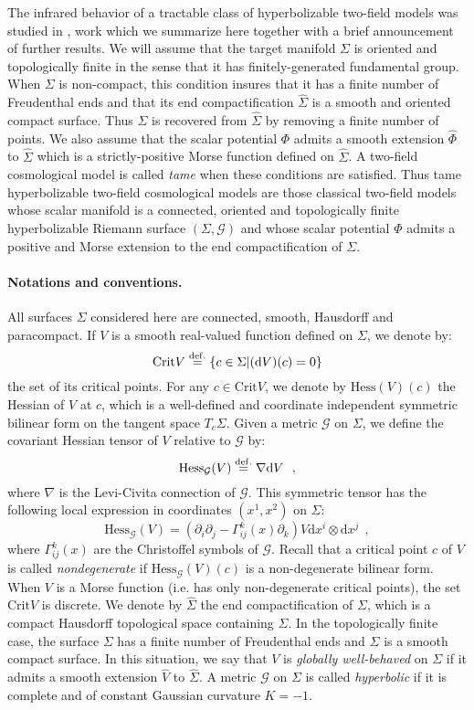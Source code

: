 \documentclass[a4paper,11pt]{article}
\theoremstyle{plain}
\theoremstyle{definition}
\theoremstyle{remark}
\newcommand{\be}{\begin{equation*}}
\newcommand{\ee}{\end{equation*}}
\def\Hess{\mathrm{Hess}}
\def\Crit{\mathrm{Crit}}
\def\hV{\widehat{V}}
\newcommand{\pd}{\partial}
\def\dd{\mathrm{d}}
\def\cG{\mathcal{G}}
\newcommand{\eqdef}{\stackrel{{\rm def.}}{=}}
\def\hSigma{\widehat{\Sigma}}
\def\hV{\widehat{V}}
\def\hPhi{{\hat \Phi}}
\begin{document}
The infrared behavior of a tractable class of hyperbolizable two-field
models was studied in \cite{grad}, work which we summarize here
together with a brief announcement of further results. We will assume
that the target manifold $\Sigma$ is oriented and topologically finite
in the sense that it has finitely-generated fundamental group. When
$\Sigma$ is non-compact, this condition insures that it has a finite
number of Freudenthal ends \cite{Freudenthal1} and that its end
compactification $\hSigma$ is a smooth and oriented compact
surface. Thus $\Sigma$ is recovered from $\hSigma$ by removing a
finite number of points.  We also assume that the scalar potential
$\Phi$ admits a smooth extension $\hPhi$ to $\hSigma$ which is a
strictly-positive Morse function defined on $\hSigma$. A two-field
cosmological model is called {\em tame} when these conditions are
satisfied. Thus tame hyperbolizable two-field cosmological models are
those classical two-field models whose scalar manifold is a
connected, oriented and topologically finite hyperbolizable Riemann
surface $(\Sigma,\cG)$ and whose scalar potential $\Phi$ admits a positive
and Morse extension to the end compactification of $\Sigma$.

\paragraph{Notations and conventions.}

All surfaces $\Sigma$ considered here are connected,
smooth, Hausdorff and paracompact. If $V$ is a smooth real-valued
function defined on $\Sigma$, we denote by:
\be
\Crit V\eqdef \{c\in \Sigma| (\dd V)(c)=0\}
\ee
the set of its critical points. For any $c\in \Crit V$, we denote
by $\Hess(V)(c)$ the Hessian of $V$ at $c$,
which is a well-defined and coordinate independent symmetric bilinear
form on the tangent space $T_c\Sigma$. Given a metric $\cG$ on
$\Sigma$, we define the covariant Hessian tensor of $V$ relative to $\cG$ by:
\be
\Hess_\cG(V)\eqdef \nabla\dd V~~,
\ee
where
$\nabla$ is the Levi-Civita connection of $\cG$. This symmetric tensor
has the following local expression in coordinates
$(x^1,x^2)$ on $\Sigma$:
\be
\Hess_\cG(V)=(\pd_i\pd_j-\Gamma^k_{ij}(x)\pd_k)V \dd x^i\otimes \dd
x^j~~,
\ee
where $\Gamma^k_{ij}(x)$ are the Christoffel symbols of $\cG$.  Recall
that a critical point $c$ of $V$ is called {\em nondegenerate} if
$\Hess_\cG(V)(c)$ is a non-degenerate bilinear form. When $V$ is a
Morse function (i.e. has only non-degenerate critical points), the set
$\Crit V$ is discrete.  We denote by $\hSigma$ the end
compactification of $\Sigma$, which is a compact Hausdorff topological
space containing $\Sigma$. In the topologically finite case, the
surface $\Sigma$ has a finite number of Freudenthal ends and $\hSigma$
is a smooth compact surface. In this situation, we say that $V$ is
{\em globally well-behaved} on $\Sigma$ if it admits a smooth
extension $\hV$ to $\hSigma$.  A metric $\cG$ on $\Sigma$ is called
{\em hyperbolic} if it is complete and of constant Gaussian curvature
$K=-1$.
\end{document}
